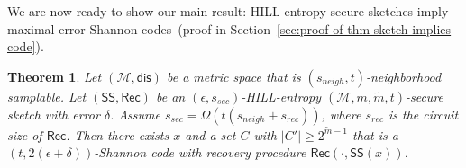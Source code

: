 \documentclass[11pt]{article}
\newcommand{\secref}[1]{\mbox{Section~\ref{#1}}}
\newcommand{\thref}[1]{\mbox{Theorem~\ref{#1}}}
\newcommand{\class}[1]{{\ensuremath{\mathsf{#1}}}}
\newcommand{\sketch}{\ensuremath{\class{SS}}\xspace}
\newcommand{\rec}{\ensuremath{\class{Rec}}\xspace}
\newcommand{\sample}{\ensuremath{\class{Sample}}\xspace}
\newcommand{\dis}{\ensuremath{\mathsf{dis}}}
\newcommand{\ngl}{\ensuremath{\mathtt{ngl}}\xspace}
\newcommand{\Hoo}{\mathrm{H}_\infty}
\newtheorem{theorem}{Theorem}[section]
\newcommand{\authnote}[2]{{\textcolor{red}{\textsf{#1 notes: }\textcolor{blue}{ #2}}\marginpar{\textcolor{red}{\textbf{!!!!!}}}}}
\newcommand{\authnote}[2]{}
\newcommand{\bnote}[1]{{\authnote{Ben}{#1}}}
\begin{document}
We are now ready to show our main result: HILL-entropy secure sketches imply maximal-error Shannon codes~(proof in \secref{sec:proof of thm sketch implies code}).
\begin{theorem}\label{thm:impSketchArbitraryW}
Let $(\mathcal{M}, \dis)$ be a metric space that is $(s_{neigh}, t)$-neighborhood samplable.  Let $(\sketch, \rec)$ be an $(\epsilon,s_{sec})$-HILL-entropy $(\mathcal{M}, m, \tilde{m}, t)$-secure sketch with error $\delta$.  Assume $s_{sec}= \Omega(t(s_{neigh}+s_{rec}))$, where $s_{rec}$ is the circuit size of $\rec$.  Then there exists $x$ and a set $C$ with $|C'|\geq 2^{\tilde{m}-1}$ that is a $(t, 2(\epsilon+\delta))$-Shannon code with recovery procedure $\rec(\cdot, \sketch(x))$.
\end{theorem}
\end{document}
